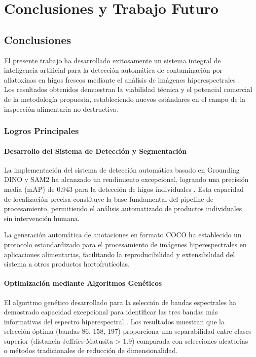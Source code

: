 \chapter{Conclusiones y Trabajo Futuro}

\section{Conclusiones}

El presente trabajo ha desarrollado exitosamente un sistema integral de inteligencia artificial para la detección automática de contaminación por aflatoxinas en higos frescos mediante el análisis de imágenes hiperespectrales \cite{russell2016artificial,geron2019hands}. Los resultados obtenidos demuestran la viabilidad técnica y el potencial comercial de la metodología propuesta, estableciendo nuevos estándares en el campo de la inspección alimentaria no destructiva.

\subsection{Logros Principales}

\subsubsection{Desarrollo del Sistema de Detección y Segmentación}
La implementación del sistema de detección automática basado en Grounding DINO y SAM2 ha alcanzado un rendimiento excepcional, logrando una precisión media (mAP) de 0.943 para la detección de higos individuales \cite{liu2023grounding}. Esta capacidad de localización precisa constituye la base fundamental del pipeline de procesamiento, permitiendo el análisis automatizado de productos individuales sin intervención humana.

La generación automática de anotaciones en formato COCO ha establecido un protocolo estandardizado para el procesamiento de imágenes hiperespectrales en aplicaciones alimentarias, facilitando la reproducibilidad y extensibilidad del sistema a otros productos hortofrutícolas.

\subsubsection{Optimización mediante Algoritmos Genéticos}
El algoritmo genético desarrollado para la selección de bandas espectrales ha demostrado capacidad excepcional para identificar las tres bandas más informativas del espectro hiperespectral \cite{goldberg1989artificial,holland1992adaptation}. Los resultados muestran que la selección óptima (bandas 86, 158, 197) proporciona una separabilidad entre clases superior (distancia Jeffries-Matusita > 1.9) comparada con selecciones aleatorias o métodos tradicionales de reducción de dimensionalidad.

